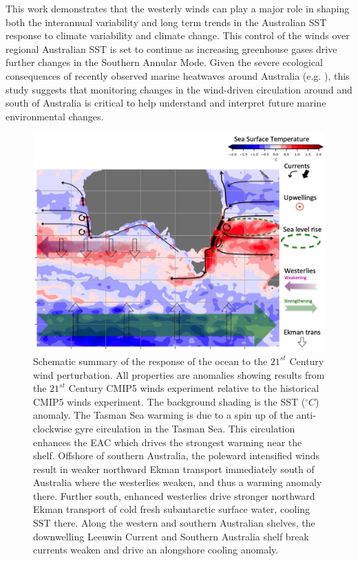 \documentclass[draft,linenumbers]{agujournal2018}
\begin{document}
This work demonstrates that the westerly winds can play a major role in shaping both the interannual variability and long term trends in the Australian SST response to climate variability and climate change. This control of the winds over regional Australian SST is set to continue as increasing greenhouse gases drive further changes in the Southern Annular Mode. Given the severe ecological consequences of recently observed marine heatwaves around Australia (e.g. \citealp{Feng2013,Oliver2017}), this study suggests that monitoring changes in the wind-driven circulation around and south of Australia is critical to help understand and interpret future marine environmental changes.

\begin{figure}[h]
\centering
\includegraphics[width=1\textwidth]{Slide1.jpg}
\caption{Schematic summary of the response of the ocean to the $21^{st}$ Century wind perturbation. All properties are anomalies showing results from the $21^{st}$ Century CMIP5 winds experiment relative to the historical CMIP5 winds experiment. The background shading is the SST ($^{\circ}C$) anomaly. The Tasman Sea warming is due to a spin up of the anti-clockwise gyre circulation in the Tasman Sea. This circulation enhances the EAC which drives the strongest warming near the shelf. Offshore of southern Australia, the poleward intensified winds result in weaker northward Ekman transport immediately south of Australia where the westerlies weaken, and thus a warming anomaly there. Further south, enhanced westerlies drive stronger northward Ekman transport of cold fresh subantarctic surface water, cooling SST there. Along the western and southern Australian shelves, the downwelling Leeuwin Current and Southern Australia shelf break currents weaken and drive an alongshore cooling anomaly.}\label{Slide1}
\end{figure}
\end{document}
